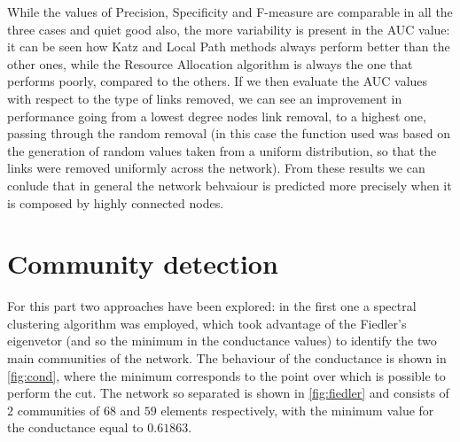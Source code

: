 \documentclass[12pt,a4paper]{article}
\begin{document}
While the values of Precision, Specificity and F-measure are comparable in all the three cases and quiet good also, the more variability is present in the AUC value: it can be seen how Katz and Local Path methods always perform better than the other ones, while the Resource Allocation algorithm is always the one that performs poorly, compared to the others. If we then evaluate the AUC values with respect to the type of links removed, we can see an improvement in performance going from a lowest degree nodes link removal, to a highest one, passing through the random removal (in this case the function used was based on the generation of random values taken from a uniform distribution, so that the links were removed uniformly across the network). From these results we can conlude that in general the network behvaiour is predicted more precisely when it is composed by highly connected nodes.
\cite{repo}
\section*{Community detection}
For this part two approaches have been explored: in the first one a spectral clustering algorithm was employed, which took advantage of the Fiedler's eigenvetor (and so the minimum in the conductance values) to identify the two main communities of the network. The behaviour of the conductance is shown in \autoref{fig:cond}, where the minimum corresponds to the point over which is possible to perform the cut. The network so separated is shown in \autoref{fig:fiedler} and consists of $2$ communities of $68$ and $59$ elements respectively, with the minimum value for the conductance equal to $0.61863$.
\end{document}

